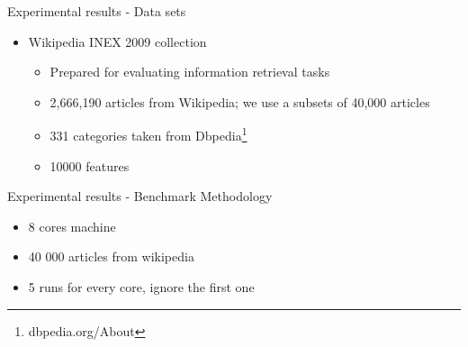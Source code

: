 \documentclass{beamer}
\begin{document}

\begin{frame}{Experimental results - Data sets}

\begin{itemize}
\item Wikipedia INEX 2009 collection \citep{conf/btw/SchenkelSK07}

\begin{itemize}
\item Prepared for evaluating information retrieval tasks
\item 2,666,190 articles from Wikipedia; we use a subsets of 40,000 articles
\item 331 categories taken from Dbpedia\footnote{dbpedia.org/About}
\item 10000 features
\end{itemize}

\end{itemize}

\end{frame}


\begin{frame}{Experimental results - Benchmark Methodology}

\begin{itemize}

\item 8 cores machine
\item 40 000 articles from wikipedia
\item 5 runs for every core, ignore the first one

\end{itemize}

\end{frame}

\end{document}
